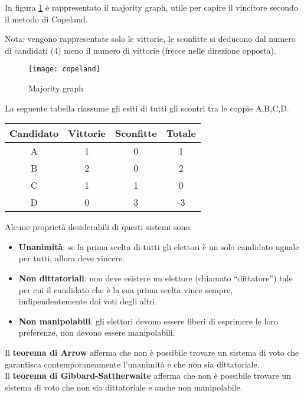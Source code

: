 In figura \ref{fig:copeland} è rappresentato il majority graph, utile
per capire il vincitore secondo il metodo di Copeland.

Nota: vengono rappresentate solo le vittorie, le sconfitte si deducono dal
numero di candidati (4) meno il numero di vittorie (frecce nelle direzione
opposta).

\begin{figure}[H]
\centering
\texttt{[image: copeland]}
\caption{Majority graph}
\label{fig:copeland}
\end{figure}

La seguente tabella riassume gli esiti di tutti gli scontri tra le coppie
A,B,C,D.

\begin{table}[H]
\begin{tabular}{|c|c|c|c|}
\hline
\textbf{Candidato} & \textbf{Vittorie} & \textbf{Sconfitte} & \textbf{Totale} \\
\hline
A & 1 & 0 & 1 \\ \hline
B & 2 & 0 & 2 \\ \hline
C & 1 & 1 & 0 \\ \hline
D & 0 & 3 & -3 \\ \hline
\end{tabular}
\end{table}

Alcune proprietà desiderabili di questi sistemi sono:

\begin{itemize}
 \item \textbf{Unanimità}: se la prima scelta di tutti gli elettori è
un solo candidato uguale per tutti, allora deve vincere.
 \item \textbf{Non dittatoriali}: non deve esistere un elettore (chiamato
``dittatore'') tale per cui il candidato che è la sua prima scelta vince 
sempre, indipendentemente dai voti degli altri.
 \item \textbf{Non manipolabili}: gli elettori devono essere liberi di
esprimere le loro preferenze, non devono essere manipolabili.
\end{itemize}

Il \textbf{teorema di Arrow} afferma che non è possibile trovare un sistema di 
voto che garantisca contemporaneamente l'unanimità e che non sia dittatoriale.\\

Il \textbf{teorema di Gibbard-Sattherwaite} afferma che non è possibile trovare
un sistema di voto che non sia dittatoriale e anche non manipolabile.\\

